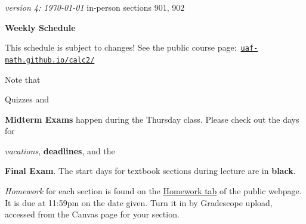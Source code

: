 \documentclass[12pt]{article}
\newcommand{\vacinline}[1]{{\color{OliveGreen} \textsl{#1}}}
\newcommand{\vac}[1]{\strut {\small {\vacinline{#1}}}}
\newcommand{\due}[1]{\strut {\color{BrickRed} \textsl{#1}}}
\newcommand{\dl}[1]{{\small \color{Purple} \textbf{#1}}}
\newcommand{\ee}[1]{\strut {\color{Blue} \textbf{#1}}}
\newcommand{\qq}[1]{\strut {\color{RedOrange} #1}}
\begin{document}
\noindent\footnotesize \emph{version 4: \today} \normalsize \hfill in-person sections 901, 902

\bigskip
\centerline{\Large \textbf{Weekly Schedule}}

\bigskip
This schedule is subject to changes!  See the public course page: \,{\small \href{https://uaf-math.github.io/calc2/}{\texttt{uaf-math.github.io/calc2/}}}

\noindent Note that \qq{Quizzes} and \ee{Midterm Exams} happen during the Thursday class.   Please check out the days for \vac{vacations}, \dl{deadlines}, and the \ee{Final Exam}.  The start days for textbook sections during lecture are in \textbf{black}.  \due{Homework} for each section is found on the \href{https://uaf-math251.github.io/calc2/}{Homework tab} of the public webpage.  It is due at 11:59pm on the date given.  Turn it in by Gradescope upload, accessed from the Canvas page for your section.

\bigskip
\end{document}
